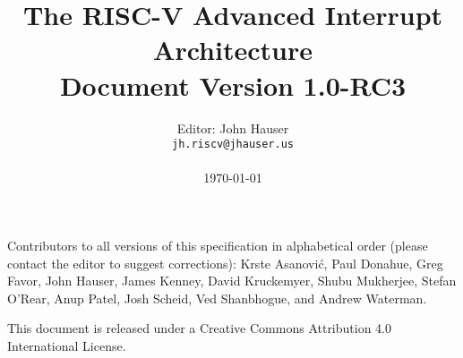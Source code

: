 \documentclass[twoside,11pt]{book}
\newcommand{\AIARev}{1.0-RC3}
\begin{document}

\title{%
  \vspace{-0.7in}%
  {\Large\bf The RISC-V Advanced Interrupt Architecture} \\
  {\large Document Version \AIARev}
  \vspace{-0.1in}%
}

\author{%
  Editor: John Hauser \\
  {\tt jh.riscv\mbox{}@jhauser.us} \\
  \\
  \today
}

\date{}
\maketitle

\thispagestyle{empty}

Contributors to all versions of this specification in alphabetical
order (please contact the editor to suggest corrections):
Krste Asanovi\'{c},
Paul Donahue,
Greg Favor,
John Hauser,
James Kenney,
David Kruckemyer,
Shubu Mukherjee,
Stefan O'Rear,
Anup Patel,
Josh Scheid,
Ved Shanbhogue,
and Andrew Waterman.

This document is released under a Creative Commons Attribution 4.0
International License.


\frontmatter



{\hypersetup{linktoc=all,hidelinks}
\tableofcontents
}


\mainmatter










\end{document}
